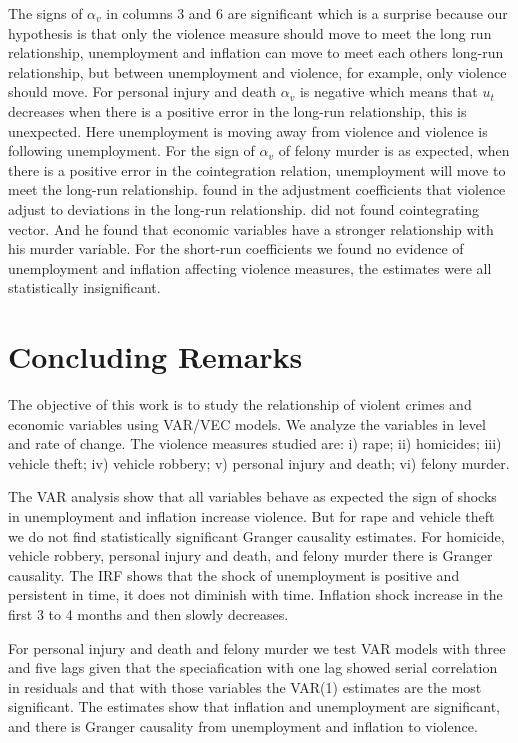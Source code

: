 \documentclass[11pt, a4paper]{article}
\begin{document}
The signs of $\alpha_v$ in columns 3 and 6 are significant which is a surprise because our hypothesis is that only the violence measure should move to meet the long run relationship, unemployment and inflation can move to meet each others long-run relationship, but between unemployment and violence, for example, only violence should move. For personal injury and death $\alpha_v$ is negative which means that $u_t$ decreases when there is a positive error in the long-run relationship, this is unexpected. Here unemployment is moving away from violence and violence is following unemployment. For the sign of $\alpha_v$ of felony murder is as expected, when there is a positive error in the cointegration relation, unemployment will move to meet the long-run relationship.
\cite{santos_kassouf2014} found in the adjustment coefficients that violence adjust to deviations 
in the long-run relationship.
\cite{saridakis2004}  did not found cointegrating vector. And he found that economic variables 
have a stronger relationship with his murder variable.  
For the short-run coefficients we found no evidence of unemployment and inflation affecting violence measures, the estimates were all statistically insignificant.






\section{Concluding Remarks}




The objective of this work is to study the relationship of violent crimes and economic variables using VAR/VEC models. We analyze the variables in level and rate of change. The violence measures studied are: i) rape; ii) homicides; iii) vehicle theft; iv) vehicle robbery; v) personal injury and death; vi) felony murder. 

The VAR analysis show that all variables behave as expected the sign of shocks in unemployment and inflation increase violence. But for rape and vehicle theft we do not find statistically significant Granger causality estimates. For homicide, vehicle robbery, personal injury and death, and felony murder there is Granger causality. The IRF shows that the shock of unemployment is positive and persistent in time, it does not diminish with time. Inflation shock increase in the first 3 to 4 months and then slowly decreases. 

For personal injury and death and felony murder we test VAR models with three and five lags given that the speciafication with one lag showed serial correlation in residuals and that with those variables the VAR(1) estimates are the most significant. The estimates show that inflation and unemployment are significant, and there is Granger causality from unemployment and inflation to violence. 
\end{document}
